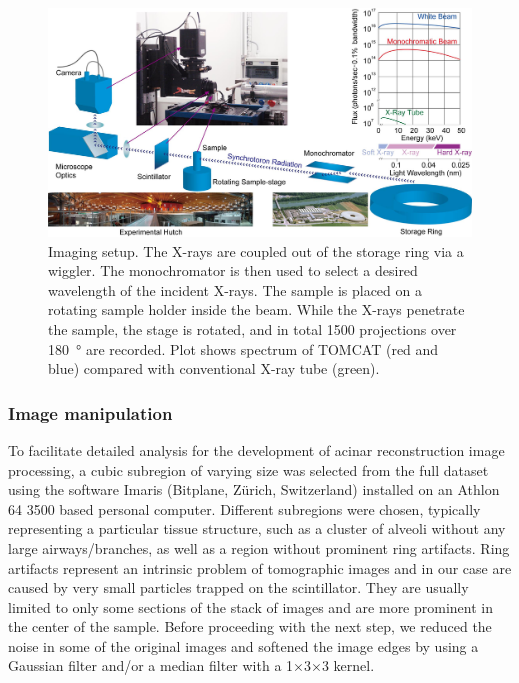 \begin{figure}[htb]
	\centering
	\includegraphics[width=\imsize]{img/Tsuda2008/Tsuda-02}
	\caption[SRXTM imaging setup]{Imaging setup. The X-rays are coupled out of the storage ring via a wiggler. The monochromator is then used to select a desired wavelength of the incident
X-rays. The sample is placed on a rotating sample holder inside the beam. While the X-rays penetrate the sample, the stage is rotated, and in total 1500 projections over \SI{180}{\degree} are recorded. Plot shows spectrum of \ac{TOMCAT} (red and blue) compared with conventional X-ray tube (green).}
	\label{fig:imaging setup}
\end{figure}

\subsubsection{Image manipulation}
To facilitate detailed analysis for the development of \threed acinar reconstruction image processing, a cubic subregion of varying size was selected from the full dataset using the software Imaris (Bitplane, Zürich, Switzerland) installed on an Athlon 64 3500 based personal computer. Different subregions were chosen, typically representing a particular tissue structure, such as a cluster of alveoli without any large airways/branches, as well as a region without prominent ring artifacts. Ring artifacts represent an intrinsic problem of tomographic images and in our case are caused by very small particles trapped on the scintillator. They are usually limited to only some sections of the stack of images and are more prominent in the center of the sample. Before proceeding with the next step, we reduced the noise in some of the original \twod images and softened the image edges by using a Gaussian filter and/or a median filter with a 1$\times$3$\times$3 kernel.


